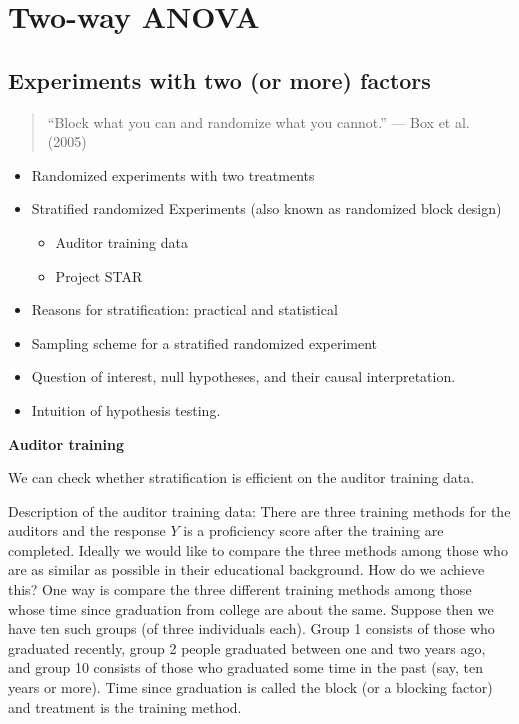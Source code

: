 \documentclass[12pt,]{book}
\providecommand{\tightlist}{%
  \setlength{\itemsep}{0pt}\setlength{\parskip}{0pt}}
\begin{document}
\chapter{Two-way ANOVA}\label{ch:anovaII}

\section{Experiments with two (or more)
factors}\label{experiments-with-two-or-more-factors}

\begin{quote}
``Block what you can and randomize what you cannot.'' --- Box et al.
(2005)
\end{quote}

\begin{itemize}
\tightlist
\item
  Randomized experiments with two treatments
\item
  Stratified randomized Experiments (also known as randomized block
  design)

  \begin{itemize}
  \tightlist
  \item
    Auditor training data
  \item
    Project STAR
  \end{itemize}
\item
  Reasons for stratification: practical and statistical
\item
  Sampling scheme for a stratified randomized experiment
\item
  Question of interest, null hypotheses, and their causal
  interpretation.
\item
  Intuition of hypothesis testing.
\end{itemize}

\textbf{Auditor training}

We can check whether stratification is efficient on the auditor training
data.

Description of the auditor training data: There are three training
methods for the auditors and the response \(Y\) is a proficiency score
after the training are completed. Ideally we would like to compare the
three methods among those who are as similar as possible in their
educational background. How do we achieve this? One way is compare the
three different training methods among those whose time since graduation
from college are about the same. Suppose then we have ten such groups
(of three individuals each). Group 1 consists of those who graduated
recently, group 2 people graduated between one and two years ago, and
group 10 consists of those who graduated some time in the past (say, ten
years or more). Time since graduation is called the block (or a blocking
factor) and treatment is the training method.
\end{document}
